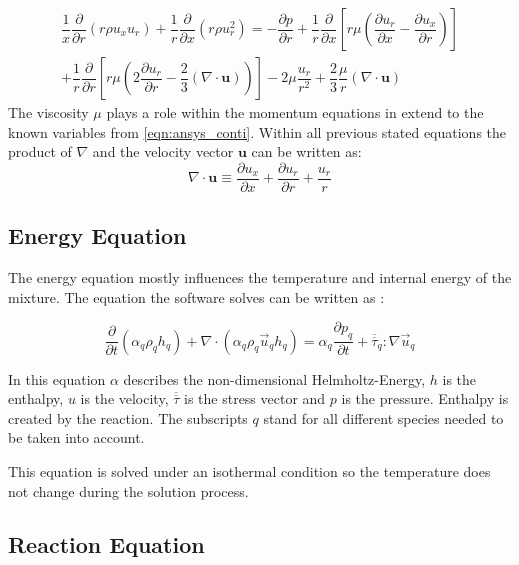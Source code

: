 \documentclass[../thesis.tex]{subfiles}
\begin{document}
\begin{gather}
	 \dfrac{1}{x} \dfrac{\partial}{\partial r}(r \rho u_x u_r)
	+ \dfrac{1}{r} \dfrac{\partial}{\partial x}(r \rho u_r^2) = 
	- \dfrac{\partial p}{\partial r} + \dfrac{1}{r} \dfrac{\partial }{\partial x} \left[ 
	r \mu \left( \dfrac{\partial u_r}{\partial x} - \dfrac{\partial u_x}{\partial r} \right)
	\right] \\ \nonumber
	+ \dfrac{1}{r} \dfrac{\partial }{\partial r} \left[ 
	r \mu \left( 2 \dfrac{\partial u_r}{\partial r} - \dfrac{2}{3}(\nabla \cdot \mathbf{u}) \right)
	\right] -
	2 \mu \dfrac{u_r}{r^2}+ \dfrac{2}{3} \dfrac{\mu}{r}(\nabla \cdot \mathbf{u})
\end{gather}
The viscosity $\mu$ plays a role within the momentum equations in extend to the known variables from \autoref{eqn:ansys_conti}. 
Within all previous stated equations the product of $\nabla$ and the velocity vector $\mathbf{u}$ can be written as:
\begin{equation}
\nabla \cdot \mathbf{u} \equiv \dfrac{\partial u_x}{\partial x} + \dfrac{\partial u_r}{\partial r}+ \dfrac{u_r}{r}
\end{equation}


\subsection{Energy Equation}

The energy equation mostly influences the temperature and internal energy of the mixture. The equation the software solves can be written as \cite{manual2009ansys}:

\begin{equation} 
\frac{\partial}{\partial t} (\alpha_q \rho_q h_q ) + \nabla \cdot (\alpha_q \rho_q \vec u_q h_q )   = \alpha_q \frac{\partial p_q}{\partial t} + \overline{\overline{\tau}}_q : \nabla \vec u_q
\end{equation}

In this equation $\alpha$ describes the non-dimensional Helmholtz-Energy, $h$ is the enthalpy, $u$ is the velocity, $\overline{\overline{\tau}}$ is the stress vector and $p$ is the pressure. Enthalpy is created by the reaction. The subscripts $q$ stand for all different species needed to be taken into account.

This equation is solved under an isothermal condition so the temperature does not change during the solution process. 

\subsection{Reaction Equation}
\label{sec: reaction_eqn}
\end{document}
